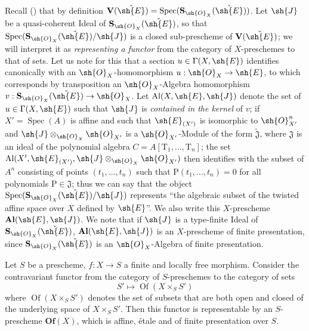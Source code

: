 \begin{env}[18.5.2]
\label{IV.18.5.2}
Recall () that by definition $\mathbf{V}(\check{\sh{E}})=\operatorname{Spec}(\mathbf{S}_{\sh{O}_X}(\check{\sh{E}}))$.
Let $\sh{J}$ be a quasi-coherent Ideal of $\mathbf{S}_{\sh{O}_X}(\check{\sh{E}})$, so that $\operatorname{Spec}(\mathbf{S}_{\sh{O}_X}(\check{\sh{E}})/\sh{J})$ is a closed sub-prescheme of $\mathbf{V}(\check{\sh{E}})$;
we will interpret it as \emph{representing a functor} from the category of $X$-preschemes to that of sets.
Let us note for this that a section $u\in\Gamma(X,\sh{E})$ identifies canonically with an $\sh{O}_X$-homomorphism $u:\sh{O}_X\to\sh{E}$, to which corresponds by transposition an $\sh{O}_X$-Algebra homomorphism $v:\mathbf{S}_{\sh{O}_X}(\check{\sh{E}})\to\sh{O}_X$.
Let $\mathrm{Al}(X,\sh{E},\sh{J})$ denote the set of $u\in\Gamma(X,\sh{E})$ such that $\sh{J}$ is \emph{contained in the kernel} of $v$;
if $X'=\operatorname{Spec}(A)$ is affine and such that $\sh{E}_{(X')}$ is isomorphic to $\sh{O}_{X'}^n$ and $\sh{J}\otimes_{\sh{O}_X}\sh{O}_{X'}$ is a $\sh{O}_{X'}$-Module of the form $\widetilde{\mathfrak{J}}$, where $\mathfrak{J}$ is an ideal of the polynomial algebra $C=A[\mathrm{T}_1,\ldots,\mathrm{T}_n]$;
the set $\mathrm{Al}(X',\sh{E}_{(X')},\sh{J}\otimes_{\sh{O}_X}\sh{O}_{X'})$ then identifies with the subset of $A^n$ consisting of points $(t_1,\ldots,t_n)$ such that $\mathrm{P}(t_1,\ldots,t_n)=0$ for all polynomials $\mathrm{P}\in\mathfrak{J}$;
thus we can say that the object $\operatorname{Spec}(\mathbf{S}_{\sh{O}_X}(\check{\sh{E}})/\sh{J})$ represents ``the algebraic subset of the twisted affine space over $X$ defined by $\sh{E}$''.
We also write this $X$-prescheme $\mathbf{Al}(\sh{E},\sh{J})$.
We note that if $\sh{J}$ is a type-finite Ideal of $\mathbf{S}_{\sh{O}_X}(\check{\sh{E}})$, $\mathbf{Al}(\sh{E},\sh{J})$ is an $X$-prescheme of finite presentation, since $\mathbf{S}_{\sh{O}_X}(\check{\sh{E}})$ is an $\sh{O}_X$-Algebra of finite presentation.
\end{env}

\begin{lemma}[18.5.3]
\label{IV.18.5.3}
Let $S$ be a prescheme, $f:X\to S$ a finite and locally free morphism.
Consider the contravariant functor from the category of $S$-preschemes to the category of sets
\[
\label{IV.18.5.3.1}
S'\mapsto\operatorname{Of}(X\times_S S')
\tag{18.5.3.1}
\]
where $\operatorname{Of}(X\times_S S')$ denotes the set of subsets that are both open and closed of the underlying space of $X\times_S S'$.
Then this functor is representable by an $S$-prescheme $\mathbf{Of}(X)$, which is affine, \'etale and of finite presentation over $S$.
\end{lemma}

